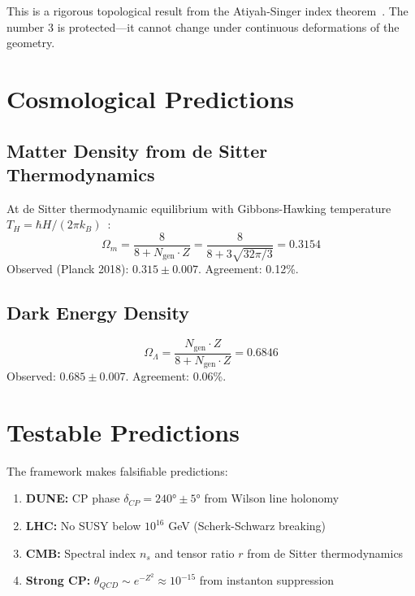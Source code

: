 \documentclass[aps,prd,twocolumn,superscriptaddress,nofootinbib]{revtex4-2}
\newcommand{\Zs}{Z^2}
\newcommand{\Ngen}{N_{\mathrm{gen}}}
\newcommand{\Omegam}{\Omega_m}
\newcommand{\OmegaL}{\Omega_\Lambda}
\begin{document}
This is a rigorous topological result from the Atiyah-Singer index theorem~\cite{AtiyahSinger1968}. The number 3 is protected---it cannot change under continuous deformations of the geometry.

\section{Cosmological Predictions}
\label{sec:cosmo}

\subsection{Matter Density from de Sitter Thermodynamics}

At de Sitter thermodynamic equilibrium with Gibbons-Hawking temperature $T_H = \hbar H/(2\pi k_B)$~\cite{GibbonsHawking1977}:
\begin{equation}
\Omegam = \frac{8}{8 + \Ngen \cdot Z} = \frac{8}{8 + 3\sqrt{32\pi/3}} = 0.3154
\end{equation}
Observed (Planck 2018): $0.315 \pm 0.007$. Agreement: 0.12\%.

\subsection{Dark Energy Density}
\begin{equation}
\OmegaL = \frac{\Ngen \cdot Z}{8 + \Ngen \cdot Z} = 0.6846
\end{equation}
Observed: $0.685 \pm 0.007$. Agreement: 0.06\%.

\section{Testable Predictions}
\label{sec:predictions}

The framework makes falsifiable predictions:

\begin{enumerate}
\item \textbf{DUNE:} CP phase $\delta_{CP} = 240° \pm 5°$ from Wilson line holonomy
\item \textbf{LHC:} No SUSY below $10^{16}$ GeV (Scherk-Schwarz breaking)
\item \textbf{CMB:} Spectral index $n_s$ and tensor ratio $r$ from de Sitter thermodynamics
\item \textbf{Strong CP:} $\theta_{QCD} \sim e^{-\Zs} \approx 10^{-15}$ from instanton suppression
\end{enumerate}
\end{document}
